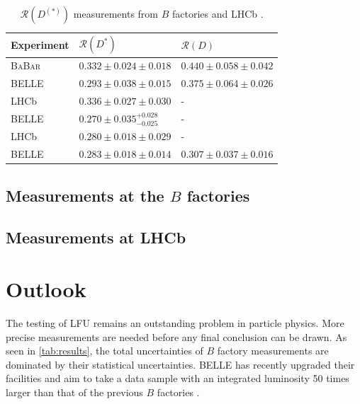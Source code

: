 \documentclass[12pt,letterpaper]{article}
\def\BaBar/{\textsc{BaBar}}
\def\RD/{\ensuremath{\mathcal{R}(D)}}
\def\RDst/{\ensuremath{\mathcal{R}(D^{*})}}
\def\RDDst/{\ensuremath{\mathcal{R}(D^{(*)})}}
\begin{document}
\begin{table}[ht]
    \centering
    \caption{
        \RDDst/ measurements from $B$ factories and LHCb \cite{HFLAV:2019}.
    }
    \label{tab:results}
    \vspace{1em}
    \begin{tabular}{lll}
        \toprule
        Experiment  &  \RDst/                               &  \RD/                         \\
        \midrule
        \BaBar/     &  $0.332 \pm 0.024 \pm 0.018$          &  $0.440 \pm 0.058 \pm 0.042$  \\
        BELLE       &  $0.293 \pm 0.038 \pm 0.015$          &  $0.375 \pm 0.064 \pm 0.026$  \\
        LHCb        &  $0.336 \pm 0.027 \pm 0.030$          &  -                            \\
        BELLE       &  $0.270 \pm 0.035^{+0.028}_{-0.025}$  &  -                            \\
        LHCb        &  $0.280 \pm 0.018 \pm 0.029$          &  -                            \\
        BELLE       &  $0.283 \pm 0.018 \pm 0.014$          &  $0.307 \pm 0.037 \pm 0.016$  \\
        \bottomrule
    \end{tabular}
\end{table}

\subsection{Measurements at the $B$ factories} \label{sec:meas_bfactories}


\subsection{Measurements at LHCb} \label{sec:meas_lhcb}


\section{Outlook}
The testing of LFU remains an outstanding problem in particle physics.
More precise measurements are needed before any final conclusion can be drawn.
As seen in \autoref{tab:results}, the total uncertainties of $B$ factory
measurements are dominated by their statistical uncertainties.
BELLE has recently upgraded their facilities and aim to take a data sample with
an integrated luminosity 50 times larger than that of the previous $B$
factories \cite{Abe:2010gxa}.
\end{document}
